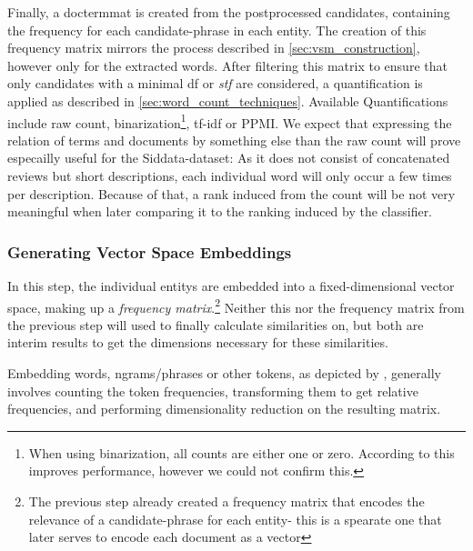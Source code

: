 Finally, a \gls{doctermmat} is created from the postprocessed candidates, containing the frequency for each candidate-phrase in each entity. The creation of this frequency matrix mirrors the process described in \autoref{sec:vsm_construction}, however only for the extracted words. After filtering this matrix to ensure that only candidates with a minimal \gls{df} or \textit{stf} are considered, a quantification is applied as described in \autoref{sec:word_count_techniques}. Available Quantifications include raw count, binarization\footnote{When using binarization, all counts are either one or zero. According to \textcite{Alshaikh2020} this improves performance, however we could not confirm this.}, tf-idf or PPMI. We expect that expressing the relation of terms and documents by something else than the raw count will prove especailly useful for the Siddata-dataset: As it does not consist of concatenated reviews but short descriptions, each individual word will only occur a few times per description. Because of that, a \gls{rank} induced from the count will be not very meaningful when later comparing it to the ranking induced by the classifier.

\subsubsection{Generating Vector Space Embeddings}
\label{sec:generate_vectorspaces}

In this step, the individual \glspl{entity} are embedded into a fixed-dimensional vector space, making up a \emph{frequency matrix}.\footnote{The previous step already created a frequency matrix that encodes the relevance of a candidate-phrase for each entity- this is a spearate one that later serves to encode each document as a vector} Neither this nor the frequency matrix from the previous step will used to finally calculate similarities on, but both are interim results to get the dimensions necessary for these similarities.


Embedding words, \glspl{ngram}/phrases or other tokens, as depicted by \cite{Turney2010,Lowe}, generally involves counting the token frequencies, transforming them to get relative frequencies, and performing dimensionality reduction on the resulting matrix.

